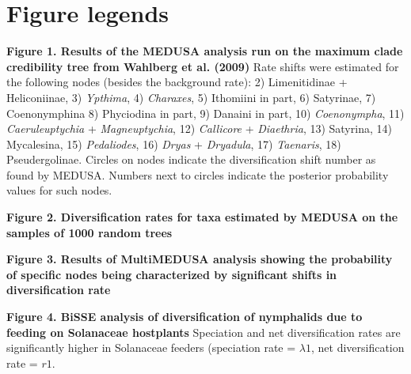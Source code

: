 \documentclass[10pt]{article}
\begin{document}
\section*{Figure legends}
\begin{description}
 \item {\bf Figure 1. Results of the MEDUSA analysis run on the maximum
clade credibility tree from Wahlberg et al. (2009)} Rate shifts were estimated for the
following nodes (besides the background rate): 2) Limenitidinae +
Heliconiinae, 3) \emph{Ypthima}, 4) \emph{Charaxes}, 5) Ithomiini in
part, 6) Satyrinae, 7) Coenonymphina 8) Phyciodina in part, 9) Danaini in
part, 10) \emph{Coenonympha}, 11) \emph{Caeruleuptychia} +
\emph{Magneuptychia}, 12) \emph{Callicore} + \emph{Diaethria}, 13)
Satyrina, 14) Mycalesina, 15) \emph{Pedaliodes}, 16) \emph{Dryas} +
\emph{Dryadula}, 17) \emph{Taenaris}, 18) Pseudergolinae. Circles on
nodes indicate the diversification shift number as found by MEDUSA.
Numbers next to circles indicate the posterior probability values for
such nodes.

\item {\bf Figure 2. Diversification rates for taxa estimated by MEDUSA on
the samples of 1000 random trees}

\item {\bf Figure 3. Results of MultiMEDUSA analysis showing the
probability of specific nodes being characterized by significant shifts
in diversification rate}

\item {\bf Figure 4. BiSSE analysis of diversification of nymphalids due
to feeding on Solanaceae hostplants} Speciation and net diversification
rates are significantly higher in Solanaceae feeders (speciation rate =
$\lambda1$, net diversification rate = $r1$.
\end{description}
\end{document}
